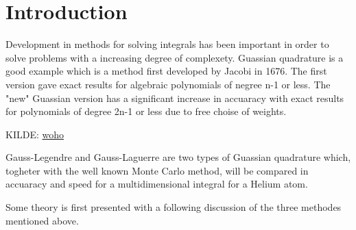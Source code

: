 \documentclass[../main.tex]{subfiles}
\begin{document}
\section{Introduction} \label{sec:intro}
Development in methods for solving integrals has been important in order to solve problems with a increasing degree of complexety. Guassian quadrature is a good example which is a method first developed by Jacobi in 1676. The first version gave exact results for algebraic polynomials of negree n-1 or less. The "new" Guassian version has a significant increase in accuaracy with exact results for polynomials of degree 2n-1 or less due to free choise of weights.


KILDE:
\href{https://www.jstor.org/stable/24898684?seq=2#metadata_info_tab_contents}{woho}

Gauss-Legendre and Gauss-Laguerre are two types of Guassian quadrature  which, togheter with the well known Monte Carlo method, will be compared in accuaracy and speed for a multidimensional integral for a Helium atom.

Some theory is first presented with a following discussion of the three methodes mentioned above.
\end{document}
